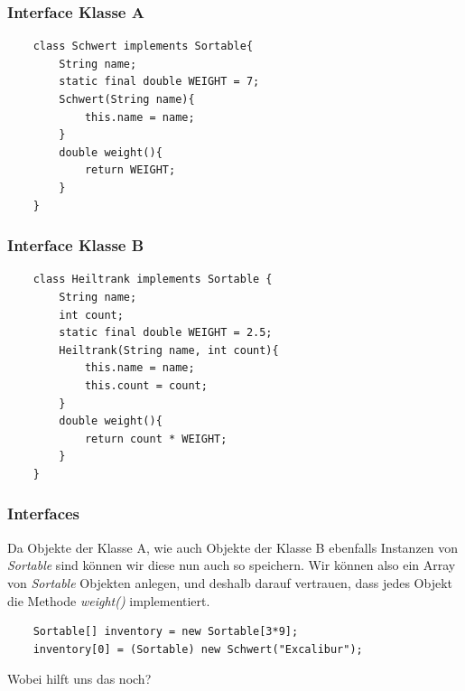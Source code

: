 \begin{frame}[fragile]
\frametitle{Interface Klasse A}
\begin{lstlisting}
    class Schwert implements Sortable{
        String name;
        static final double WEIGHT = 7;
        Schwert(String name){
            this.name = name;
        }
        double weight(){
            return WEIGHT;
        }
    }
\end{lstlisting}
\end{frame}

\begin{frame}[fragile]
\frametitle{Interface Klasse B}
\begin{lstlisting}
    class Heiltrank implements Sortable {
        String name;
        int count;
        static final double WEIGHT = 2.5;
        Heiltrank(String name, int count){
            this.name = name;
            this.count = count;
        }
        double weight(){
            return count * WEIGHT;
        }
    }
\end{lstlisting}
\end{frame}

\begin{frame}[fragile]
\frametitle{Interfaces}
Da Objekte der Klasse A, wie auch Objekte der Klasse B ebenfalls Instanzen von \textit{Sortable} sind können wir diese nun auch so speichern. Wir können also ein Array von \textit{Sortable} Objekten anlegen, und deshalb darauf vertrauen, dass jedes Objekt die Methode \textit{weight()} implementiert.
\begin{lstlisting}
    Sortable[] inventory = new Sortable[3*9];
    inventory[0] = (Sortable) new Schwert("Excalibur");
\end{lstlisting}
Wobei hilft uns das noch?
\end{frame}